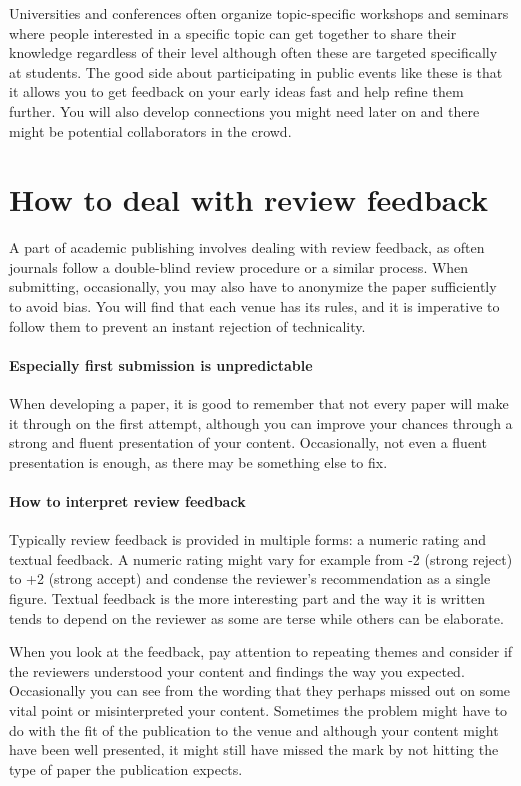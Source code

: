 Universities and conferences often organize topic-specific workshops and seminars where people interested in a specific topic can get together to share their knowledge regardless of their level although often these are targeted specifically at students.
The good side about participating in public events like these is that it allows you to get feedback on your early ideas fast and help refine them further.
You will also develop connections you might need later on and there might be potential collaborators in the crowd.

\section{How to deal with review feedback}

A part of academic publishing involves dealing with review feedback, as often journals follow a double-blind review procedure or a similar process. When submitting, occasionally, you may also have to anonymize the paper sufficiently to avoid bias.
You will find that each venue has its rules, and it is imperative to follow them to prevent an instant rejection of technicality.

\paragraph{Especially first submission is unpredictable}

When developing a paper, it is good to remember that not every paper will make it through on the first attempt, although you can improve your chances through a strong and fluent presentation of your content.
Occasionally, not even a fluent presentation is enough, as there may be something else to fix.

\paragraph{How to interpret review feedback}

Typically review feedback is provided in multiple forms: a numeric rating and textual feedback.
A numeric rating might vary for example from -2 (strong reject) to +2 (strong accept) and condense the reviewer's recommendation as a single figure.
Textual feedback is the more interesting part and the way it is written tends to depend on the reviewer as some are terse while others can be elaborate.

When you look at the feedback, pay attention to repeating themes and consider if the reviewers understood your content and findings the way you expected.
Occasionally you can see from the wording that they perhaps missed out on some vital point or misinterpreted your content.
Sometimes the problem might have to do with the fit of the publication to the venue and although your content might have been well presented, it might still have missed the mark by not hitting the type of paper the publication expects.

